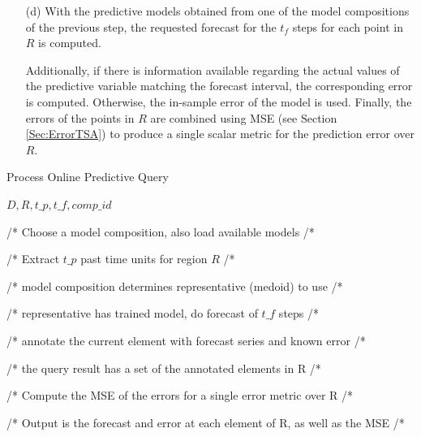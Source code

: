\begin{itemize}
 \item [(d)] With the predictive models obtained from one of the model compositions of the previous step, the requested forecast for the $t_{f}$ steps for each point in $R$ is computed. 
 
 Additionally, if there is information available regarding the actual values of the predictive variable matching the forecast interval, the corresponding error is computed. Otherwise, the in-sample error of the model is used. Finally, the errors of the points in $R$ are combined using MSE (see Section \ref{Sec:ErrorTSA}) to produce a single scalar metric for the prediction error over $R$.
\end{itemize}

\begin{algorithm}[h!]
\caption{Process Online Predictive Query}\label{alg:online}
\begin{algorithmic}[1] 
 {$D, R, t\_p, t\_f, comp\_id $}

/* Choose a model composition, also load available models /*

/* Extract $t\_p$ past time units for region $R$ /*



 /* model composition determines representative (medoid) to use /*
 
 /* representative has trained model, do forecast of $t\_f$ steps /*
 
 /* annotate the current element with forecast series and known error /*
 
 /* the query result has a set of the annotated elements in R /*
\EndFor

/* Compute the MSE of the errors for a single error metric over R /*

/* Output is the forecast and error at each element of R, as well as the MSE /* 
\EndFunction 
\end{algorithmic} 
\end{algorithm} 

